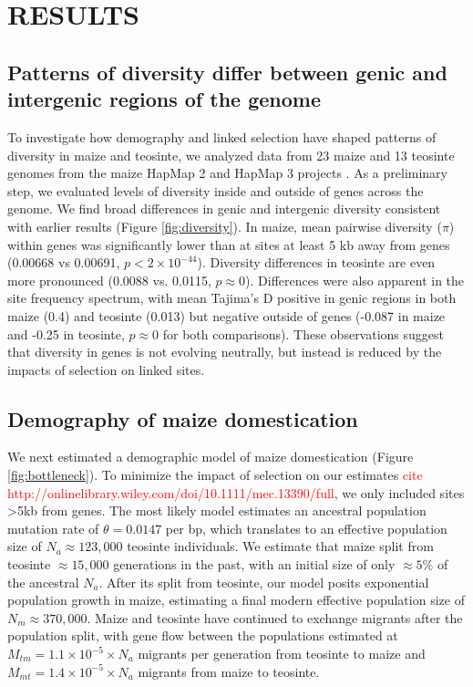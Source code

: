 \documentclass[12pt,a4paper]{article}
\newcommand{\jri}[1]{\textcolor{red}{\scriptsize #1}}
\begin{document}
\section*{RESULTS}

\subsection*{Patterns of diversity differ between genic and  intergenic regions of the genome} %
To investigate how demography and linked selection have shaped patterns of diversity in maize and teosinte, we analyzed data from 23 maize and 13 teosinte genomes from the maize HapMap 2 and HapMap 3 projects \cite{chia2012, bukowski2015}. As a preliminary step, we evaluated levels of diversity inside and outside of genes across the genome. We find broad differences in genic and intergenic diversity consistent with earlier results  \cite{hufford2012}(Figure \ref{fig:diversity}).  In maize, mean pairwise diversity ($\pi$) within genes was significantly lower than at sites at least 5 kb away from genes (0.00668 vs 0.00691, $p<2\times 10^{-44}$). 
Diversity differences in teosinte are even more pronounced (0.0088 vs. 0.0115, $p\approx 0$). 
Differences were also apparent in the site frequency spectrum, with mean Tajima's D positive in genic regions in both maize (0.4) and teosinte (0.013) but negative outside of genes (-0.087 in maize and -0.25 in teosinte, $p\approx 0$ for both comparisons).
These observations suggest that diversity in genes is not evolving neutrally, but instead is reduced by the impacts of selection on linked sites. 



\subsection*{Demography of maize domestication} %
We next estimated a demographic model of maize domestication (Figure \ref{fig:bottleneck}). 
To minimize the impact of selection on our estimates \jri{cite http://onlinelibrary.wiley.com/doi/10.1111/mec.13390/full}, we only included sites \textgreater 5kb from genes.  
The most likely model estimates an ancestral population mutation rate of $\theta=0.0147$ per bp, which translates to an effective population size of $N_a \approx 123,000$ teosinte individuals.
We estimate that maize split from teosinte $\approx 15,000$ generations in the past, with an initial size of only $\approx 5\% $ of the ancestral $N_a$. 
After its split from teosinte, our model posits exponential population growth in maize, estimating a final modern effective population size of $N_m \approx 370,000$.
Maize and teosinte have continued to exchange migrants after the population split, with gene flow between the populations estimated at $M_{tm} =  1.1 \times 10^{-5} \times N_a $  migrants per generation from teosinte to maize and $M_{mt} =  1.4 \times 10^{-5} \times N_a$ migrants from maize to teosinte. 
\end{document}
